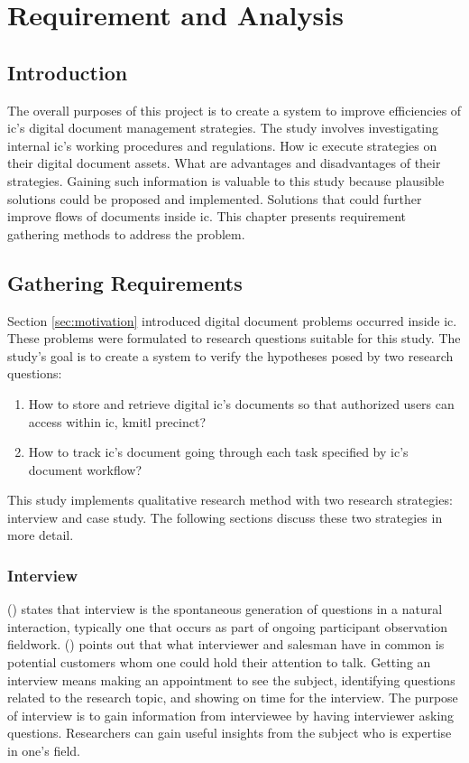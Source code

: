 \chapter{Requirement and Analysis}
\section{Introduction}
The overall purposes of this project is to create a system to improve efficiencies of \gls{ic}'s digital document management strategies. 
The study involves investigating internal \gls{ic}'s working procedures and regulations.
How \gls{ic} execute strategies on their digital document assets.
What are advantages and disadvantages of their strategies.
Gaining such information is valuable to this study because plausible solutions could be proposed and implemented. 
Solutions that could further improve flows of documents inside \gls{ic}.
This chapter presents requirement gathering methods to address the problem.

\section{Gathering Requirements}
Section \ref{sec:motivation} introduced digital document problems occurred inside \gls{ic}.
These problems were formulated to research questions suitable for this study.
The study's goal is to create a system to verify the hypotheses posed by two research questions:
\begin{enumerate}
	\item How to store and retrieve digital \gls{ic}'s documents so that authorized users can access within \gls{ic}, \gls{kmitl} precinct?
	\item How to track \gls{ic}'s document going through each task specified by \gls{ic}'s document workflow?
\end{enumerate}
This study implements qualitative research method with two research strategies: interview and case study.
The following sections discuss these two strategies in more detail.

\subsection{Interview}
\citeauthor{gall7j} (\citeyear{gall7j}) states that interview is the spontaneous generation of questions in a natural interaction, typically one that occurs as part of ongoing participant observation fieldwork.
\citeauthor{brady2011craft} (\citeyear{brady2011craft}) points out that what interviewer and salesman have in common is potential customers whom one could hold their attention to talk.
Getting an interview means making an appointment to see the subject, identifying questions related to the research topic, and showing on time for the interview.
The purpose of interview is to gain information from interviewee by having interviewer asking questions.
Researchers can gain useful insights from the subject who is expertise in one's field.

